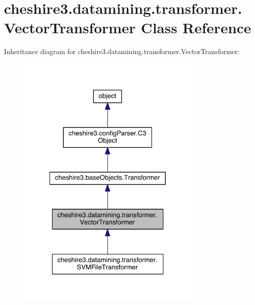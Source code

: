 \hypertarget{classcheshire3_1_1datamining_1_1transformer_1_1_vector_transformer}{\section{cheshire3.\-datamining.\-transformer.\-Vector\-Transformer Class Reference}
\label{classcheshire3_1_1datamining_1_1transformer_1_1_vector_transformer}
}


Inheritance diagram for cheshire3.\-datamining.\-transformer.\-Vector\-Transformer\-:
\nopagebreak
\begin{figure}[H]
\begin{center}
\leavevmode
\includegraphics[width=254pt]{classcheshire3_1_1datamining_1_1transformer_1_1_vector_transformer__inherit__graph}
\end{center}
\end{figure}


